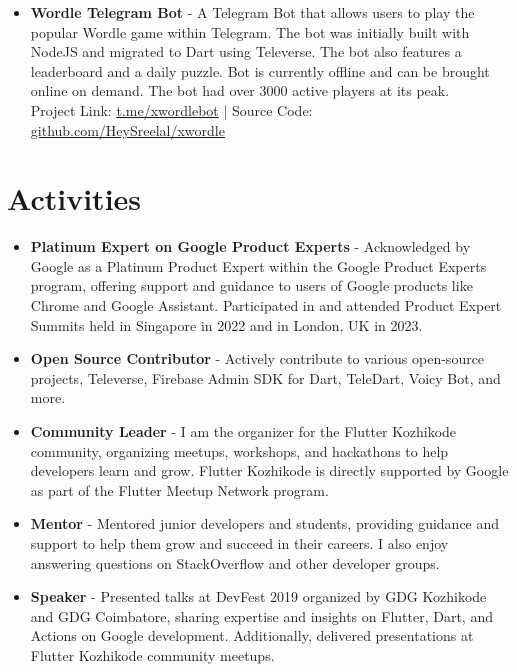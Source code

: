 \documentclass[11pt,a4paper,sans]{moderncv}
\begin{document}
\begin{itemize}[label=\textbullet]
    \item \textbf{Wordle Telegram Bot} - A Telegram Bot that allows users to play the popular Wordle game within Telegram. The bot was initially built with NodeJS and migrated to Dart using Televerse. The bot also features a leaderboard and a daily puzzle. Bot is currently offline and can be brought online on demand. The bot had over 3000 active players at its peak. \\
          Project Link: \textcolor{blue}{\href{https://t.me/xwordlebot}{t.me/xwordlebot}} | Source Code: \textcolor{blue}{\href{https://github.com/HeySreelal/xwordle}{github.com/HeySreelal/xwordle}}
\end{itemize}

\section{Activities}

\begin{itemize}[label=\textbullet]
    \item \textbf{Platinum Expert on Google Product Experts} -
          Acknowledged by Google as a Platinum Product Expert within the Google Product Experts program, offering support and guidance to users of Google products like Chrome and Google Assistant. Participated in and attended Product Expert Summits held in Singapore in 2022 and in London, UK in 2023.
    \item \textbf{Open Source Contributor} - Actively contribute to various open-source projects, Televerse, Firebase Admin SDK for Dart, TeleDart, Voicy Bot, and more.
    \item \textbf{Community Leader} - I am the organizer for the Flutter Kozhikode community, organizing meetups, workshops, and hackathons to help developers learn and grow. Flutter Kozhikode is directly supported by Google as part of the Flutter Meetup Network program.
    \item \textbf{Mentor} - Mentored junior developers and students, providing guidance and support to help them grow and succeed in their careers. I also enjoy answering questions on StackOverflow and other developer groups.
    \item \textbf{Speaker} - Presented talks at DevFest 2019 organized by GDG Kozhikode and GDG Coimbatore, sharing expertise and insights on Flutter, Dart, and Actions on Google development. Additionally, delivered presentations at Flutter Kozhikode community meetups.
\end{itemize}
\end{document}
